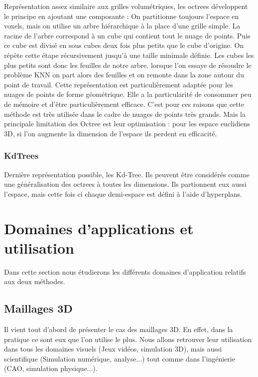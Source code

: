 Représentation assez similaire aux grilles volumétriques, les octrees développent le principe en ajoutant une composante : On partitionne toujours l'espace en voxels, mais on utilise un arbre hiérarchique à la place d'une grille simple. La racine de l'arbre correspond à un cube qui contient tout le nuage de points. Puis ce cube est divisé en sous cubes deux fois plus petits que le cube d'origine. On répète cette étape récursivement jusqu'à une taille minimale définie. Les cubes les plus petits sont donc les feuilles de notre arbre. lorsque l'on essaye de résoudre le problème KNN on part alors des feuilles et on remonte dans la zone autour du point de travail.
\newline
Cette représentation est particulièrement adaptée pour les nuages de points de forme géométrique. Elle a la particularité de consommer peu de mémoire et d'être particulièrement efficace. C'est pour ces raisons que cette méthode est très utilisée dans le cadre de nuages de points très grands. Mais la principale limitation des Octree est leur optimisation : pour les espace euclidiens 3D, si l'on augmente la dimension de l'espace ils perdent en efficacité.

\subsubsection{KdTrees}
Dernière représentation possible, les Kd-Tree. Ils peuvent être considérés comme une généralisation des octrees à toutes les dimensions. Ils partionnent eux aussi l'espace, mais cette fois ci chaque demi-espace est défini à l'aide d'hyperplans.


\section{Domaines d'applications et utilisation}
Dans cette section nous étudierons les différents domaines d'application relatifs aux deux méthodes.

\subsection{Maillages 3D}
Il vient tout d'abord de présenter le cas des maillages 3D. En effet, dans la pratique ce sont eux que l'on utilise le plus. Nous allons retrouver leur utilisation dans tous les domaines visuels (Jeux vidéos, simulation 3D), mais aussi scientifique (Simulation numérique, analyse...) tout comme dans l'ingénierie (CAO, simulation physique...).
